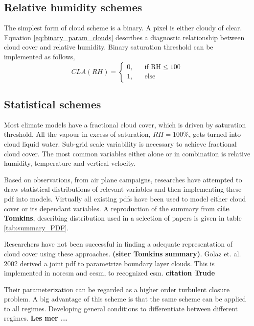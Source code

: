 \subsection{Relative humidity schemes}
The simplest form of cloud scheme is a binary. A pixel is either cloudy of clear. Equation \eqref{eq:binary_param_clouds} describes a diagnostic relationship between cloud cover and relative humidity. Binary saturation threshold can be implemented as follows,
\begin{equation} \label{eq:binary_param_clouds}
    CLA\left(RH\right) = 
     \begin{cases}
       \text{0,} &\quad\text{if RH}\le100\\
       \text{1,} &\quad\text{else}
     \end{cases}
\end{equation}

\subsection{Statistical schemes}
Most climate models have a fractional cloud cover, which is driven by saturation threshold. All the vapour in excess of saturation, $RH=100\%$, gets turned into cloud liquid water. Sub-grid scale variability is necessary to achieve fractional cloud cover. The most common variables either alone or in combination is relative humidity, temperature and vertical velocity. 

Based on observations, from air plane campaigns, researches have attempted to draw statistical distributions of relevant variables and then implementing these \acrshort{pdf} into models. Virtually all existing \acrshort{pdf}s have been used to model either cloud cover or its dependant variables. %
A reproduction of the summary from \textbf{cite Tomkins}, describing distribution used in a selection of papers is given in table \ref{tab:summary_PDF}.


Researchers have not been successful in finding a adequate representation of cloud cover using these approaches. \textbf{(siter Tomkins summary)}. Golaz et. al. 2002 derived a joint \acrshort{pdf} to parametrize boundary layer clouds. This is implemented in \acrfull{noresm} and \acrfull{cesm}, to recognized \acrshort{esm}. \textbf{citation Trude} 

Their parameterization can be regarded as a higher order turbulent closure problem. A big advantage of this scheme is that the same scheme can be applied to all regimes. Developing general conditions to differentiate between different regimes. \textbf{Les mer ...}

